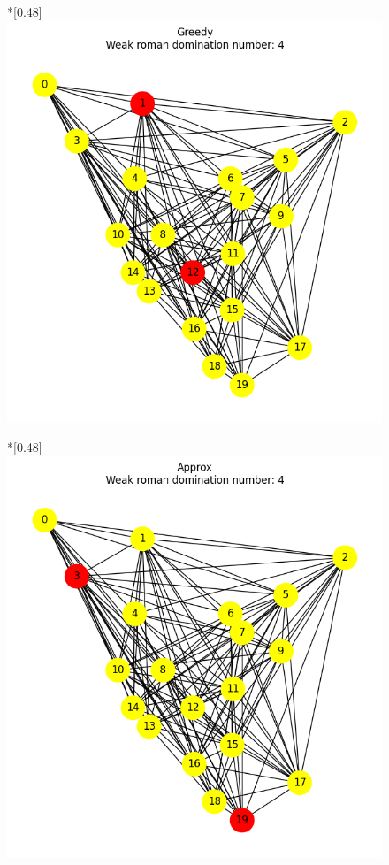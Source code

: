 \begin{figure}[H]
\begin{subcaptionbox}
        \end{subcaptionbox}
        \hfill
        \begin{subcaptionbox}*{}[0.48\linewidth]
            {\includegraphics[width=0.75\linewidth]{assets/plots/Greedy/ErdosRenyi_dense_n20_i2_results.png}}
        \end{subcaptionbox}
        \hfill
        \begin{subcaptionbox}*{}[0.48\linewidth]
            {\includegraphics[width=0.75\linewidth]{assets/plots/Approx/ErdosRenyi_dense_n20_i2_results.png}}
        \end{subcaptionbox}

\end{figure}
